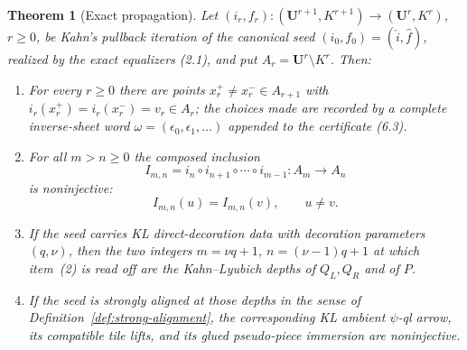 \documentclass[11pt,reqno]{amsart}
\newtheorem{theorem}{Theorem}[section]
\theoremstyle{definition}
\theoremstyle{remark}
\begin{document}
\begin{theorem}[Exact propagation]\label{thm:propagation}
Let \((i_r,f_r)\colon(\mathbf U^{r+1},K^{r+1})\to(\mathbf U^r,K^r)\), \(r\ge0\), be Kahn's pullback iteration of the canonical seed \((i_0,f_0)=(\widehat i,\widehat f)\), realized by the exact equalizers (2.1), and put \(A_r=\mathbf U^r\setminus K^r\).  Then:
\begin{enumerate}
\item For every \(r\ge0\) there are points \(x_r^+\ne x_r^-\in A_{r+1}\) with \(i_r(x_r^+)=i_r(x_r^-)=v_r\in A_r\); the choices made are recorded by a complete inverse-sheet word \(\omega=(\epsilon_0,\epsilon_1,\dots)\) appended to the certificate (6.3).
\item For all \(m>n\ge0\) the composed inclusion
\[
 I_{m,n}=i_n\circ i_{n+1}\circ\cdots\circ i_{m-1}\colon A_m\to A_n   \tag{7.4}
\]
is noninjective:
\[
 I_{m,n}(u)=I_{m,n}(v),\qquad u\ne v.                 \tag{7.5}
\]
\item If the seed carries KL direct-decoration data with decoration parameters \((q,\nu)\), then the two integers \(m=\nu q+1\), \(n=(\nu-1)q+1\) at which item~(2) is read off are the Kahn--Lyubich depths of \(Q_L,Q_R\) and of \(P\).
\item If the seed is strongly aligned at those depths in the sense of Definition~\ref{def:strong-alignment}, the corresponding KL ambient \(\psi\)-ql arrow, its compatible tile lifts, and its glued pseudo-piece immersion are noninjective.
\end{enumerate}
\end{theorem}
\end{document}
